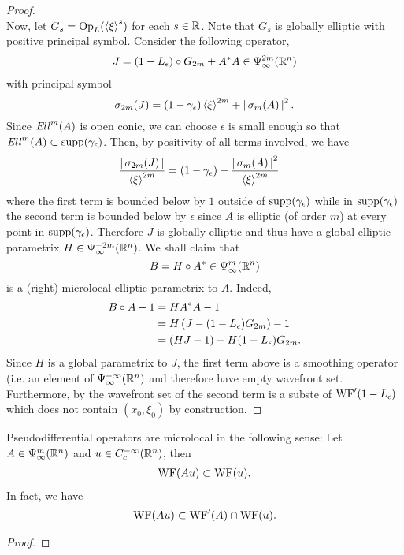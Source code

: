 \documentclass{article}
\begin{document}
\begin{proof}
    \\
    Now, let $G_s = \mathrm{Op}_L(\sym[\xi]^s)$ for each $s \in \R$. Note that $G_s$ is globally elliptic with positive principal symbol. Consider the following operator, 
    \begin{align*}
    J = (1 - L_\epsilon) \circ G_{2m} + A^* A \in \Psi^{2m}_\infty(\R^n)
    \end{align*}
    with principal symbol 
    \[
    \sigma_{2m}(J) = (1 - \gamma_\epsilon)\sym[\xi]^{2m} + \abs{\sigma_m(A)}^2. 
    \]
    Since $\Ell^m(A)$ is open conic, we can choose $\epsilon$ is small enough so that $\Ell^{m}(A) \subset \supp(\gamma_\epsilon)$. Then, by positivity of all terms involved, we have
    \begin{align*}
    \frac{\abs{\sigma_{2m}(J)} }{\sym[\xi]^{2m}}
    &= (1 - \gamma_\epsilon) + \frac{\abs{\sigma_m(A)}^2}{\sym[\xi]^{2m}}
    \end{align*}
    where the first term is bounded below by $1$ outside of $\supp(\gamma_\epsilon)$ while in $\supp(\gamma_\epsilon)$ the second term is bounded below by $\epsilon$ since $A$ is elliptic (of order $m$) at every point in $\supp(\gamma_\epsilon)$. Therefore $J$ is globally elliptic and thus have a global elliptic parametrix $H \in \Psi^{-2m}_\infty(\R^n)$. We shall claim that 
    \[
    B = H \circ A^* \in \Psi^m_\infty(\R^n)
    \]
    is a (right) microlocal elliptic parametrix to $A$. Indeed, 
    \begin{align*}
    B \circ A - 1 
    &= H A^*A - 1 \\
    &= H\brac{J - (1 - L_\epsilon)G_{2m}} - 1\\
    &= (HJ - 1) - H(1 - L_\epsilon)G_{2m}. 
    \end{align*}
    Since $H$ is a global parametrix to $J$, the first term above is a smoothing operator (i.e. an element of $\Psi^{-\infty}_\infty(\R^n)$ and therefore have empty wavefront set. Furthermore, by \cite{wavefront of compositiion} the wavefront set of the second term is a subste of $\WF'(1 - L_\epsilon)$ which does not contain $(x_0, \xi_0)$ by construction. 
\end{proof}

\begin{fprop}
    Pseudodifferential operators are microlocal in the following sense: 
    Let $A \in \Psi^m_\infty(\R^n)$ and $u \in C^{-\infty}_c(\R^n)$, then 
    \begin{align}
    \WF(Au) \subset \WF(u). 
    \end{align}
    In fact, we have 
    \begin{align*}
    \WF(Au) \subset \WF'(A) \cap \WF(u). 
    \end{align*}
\end{fprop}
\begin{proof}
    
\end{proof}
\end{document}
